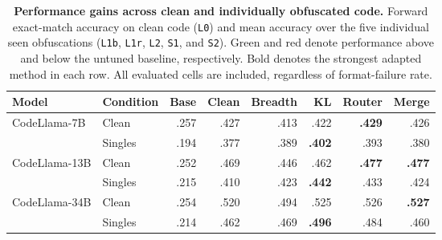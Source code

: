 \begin{table}[!t]
\centering
\small
\setlength{\tabcolsep}{4.5pt}
\renewcommand{\arraystretch}{1.02}

\caption{\textbf{Performance gains across clean and individually obfuscated
code.}
Forward exact-match accuracy on clean code (\texttt{L0}) and mean accuracy
over the five individual seen obfuscations
(\texttt{L1b}, \texttt{L1r}, \texttt{L2}, \texttt{S1}, and \texttt{S2}).
Green and red denote performance above and below the untuned baseline,
respectively. Bold denotes the strongest adapted method in each row.
All evaluated cells are included, regardless of format-failure rate.}
\label{tab:rq1_performance}

\begin{tabular}{@{}llrrrrrr@{}}
\toprule
\textbf{Model} &
\textbf{Condition} &
\textbf{Base} &
\textbf{Clean} &
\textbf{Breadth} &
\textbf{KL} &
\textbf{Router} &
\textbf{Merge} \\
\midrule

CodeLlama-7B
& Clean
& .257
& \textcolor{green!55!black}{.427}
& \textcolor{green!55!black}{.413}
& \textcolor{green!55!black}{.422}
& \textbf{\textcolor{green!55!black}{.429}}
& \textcolor{green!55!black}{.426} \\
& Singles
& .194
& \textcolor{green!55!black}{.377}
& \textcolor{green!55!black}{.389}
& \textbf{\textcolor{green!55!black}{.402}}
& \textcolor{green!55!black}{.393}
& \textcolor{green!55!black}{.380} \\

\addlinespace[2pt]

CodeLlama-13B
& Clean
& .252
& \textcolor{green!55!black}{.469}
& \textcolor{green!55!black}{.446}
& \textcolor{green!55!black}{.462}
& \textbf{\textcolor{green!55!black}{.477}}
& \textbf{\textcolor{green!55!black}{.477}} \\
& Singles
& .215
& \textcolor{green!55!black}{.410}
& \textcolor{green!55!black}{.423}
& \textbf{\textcolor{green!55!black}{.442}}
& \textcolor{green!55!black}{.433}
& \textcolor{green!55!black}{.424} \\

\addlinespace[2pt]

CodeLlama-34B
& Clean
& .254
& \textcolor{green!55!black}{.520}
& \textcolor{green!55!black}{.494}
& \textcolor{green!55!black}{.525}
& \textcolor{green!55!black}{.526}
& \textbf{\textcolor{green!55!black}{.527}} \\
& Singles
& .214
& \textcolor{green!55!black}{.462}
& \textcolor{green!55!black}{.469}
& \textbf{\textcolor{green!55!black}{.496}}
& \textcolor{green!55!black}{.484}
& \textcolor{green!55!black}{.460} \\


\end{tabular}
\end{table}
